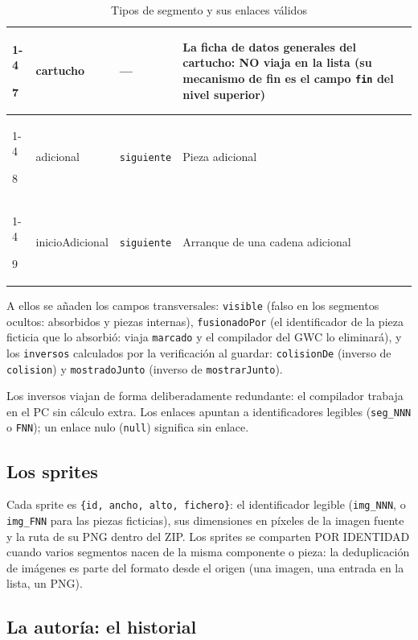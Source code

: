 \begin{table}[H]
\begin{tabularx}{\textwidth}{l l l X}
		\cmidrule(lr){1-4}
		
		7 & cartucho & --- & La ficha de datos generales del cartucho: NO viaja en la lista (su mecanismo de fin es el campo \texttt{fin} del nivel superior) \\
		
		\cmidrule(lr){1-4}
		
		8 & adicional & \texttt{siguiente} & Pieza adicional \\
		
		\cmidrule(lr){1-4}
		
		9 & inicioAdicional & \texttt{siguiente} & Arranque de una cadena adicional \\
		\bottomrule
	\end{tabularx}
	\caption{Tipos de segmento y sus enlaces válidos}
	\label{tab:A02Tipos}
\end{table}

A ellos se añaden los campos transversales: \texttt{visible} (falso en los
segmentos ocultos: absorbidos y piezas internas), \texttt{fusionadoPor} (el
identificador de la pieza ficticia que lo absorbió: viaja \texttt{marcado} y el
compilador del GWC lo eliminará), y los \texttt{inversos} calculados por la
verificación al guardar: \texttt{colisionDe} (inverso de \texttt{colision})
y \texttt{mostradoJunto} (inverso de \texttt{mostrarJunto}). 

Los inversos
viajan de forma deliberadamente redundante: el compilador trabaja en el PC
sin cálculo extra. Los enlaces apuntan a identificadores legibles
(\texttt{seg\_NNN} o \texttt{FNN}); un enlace nulo (\texttt{null}) significa
sin enlace.

\subsection{Los sprites}
\label{sec:A02Sprites}

Cada sprite es \texttt{\{id, ancho, alto, fichero\}}: el identificador
legible (\texttt{img\_NNN}, o \texttt{img\_FNN} para las piezas ficticias),
sus dimensiones en píxeles de la imagen fuente y la ruta de su PNG dentro
del ZIP. Los sprites se comparten POR IDENTIDAD cuando varios segmentos
nacen de la misma componente o pieza: la deduplicación de imágenes es parte
del formato desde el origen (una imagen, una entrada en la lista, un PNG).


\subsection{La autoría: el historial}
\label{sec:A02Autoria}

